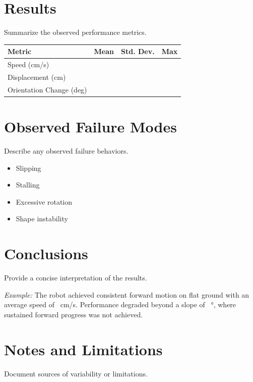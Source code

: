\documentclass[11pt]{article}
\begin{document}
\section*{Results}
Summarize the observed performance metrics.

\begin{center}
\begin{tabular}{lccc}
\toprule
Metric & Mean & Std. Dev. & Max \\
\midrule
Speed (cm/s) &  &  &  \\
Displacement (cm) &  &  &  \\
Orientation Change (deg) &  &  &  \\
\bottomrule
\end{tabular}
\end{center}

\section*{Observed Failure Modes}
Describe any observed failure behaviors.

\begin{itemize}[noitemsep]
    \item Slipping
    \item Stalling
    \item Excessive rotation
    \item Shape instability
\end{itemize}

\section*{Conclusions}
Provide a concise interpretation of the results.

\textit{Example:} The robot achieved consistent forward motion on flat ground with an average speed of \underline{\hspace{1cm}}~cm/s. Performance degraded beyond a slope of \underline{\hspace{1cm}}~\si{\degree}, where sustained forward progress was not achieved.

\section*{Notes and Limitations}
Document sources of variability or limitations.
\end{document}
